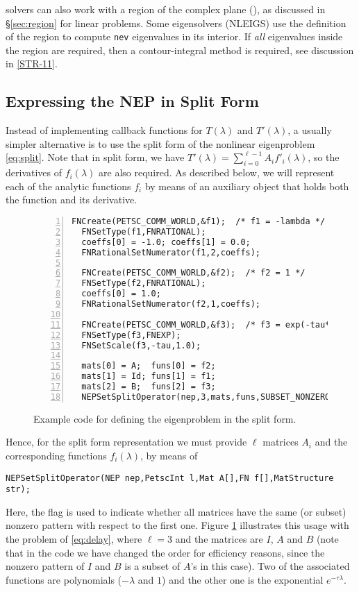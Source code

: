  solvers can also work with a region of the complex plane (), as discussed in \S\ref{sec:region} for linear problems. Some eigensolvers (NLEIGS) use the definition of the region to compute \texttt{nev} eigenvalues in its interior. If \emph{all} eigenvalues inside the region are required, then a contour-integral method is required, see discussion in \hyperlink{str}{[STR-11]}.

\subsection{\label{sec:nepsplit}Expressing the NEP in Split Form}

Instead of implementing callback functions for $T(\lambda)$ and $T'(\lambda)$, a usually simpler alternative is to use the split form of the nonlinear eigenproblem \eqref{eq:split}. Note that in split form, we have $T'(\lambda)=\sum_{i=0}^{\ell-1}A_if'_i(\lambda)$, so the derivatives of $f_i(\lambda)$ are also required. As described below, we will represent each of the analytic functions $f_i$ by means of an auxiliary object  that holds both the function and its derivative.

\begin{figure}
\begin{Verbatim}[fontsize=\small,numbers=left,numbersep=6pt,xleftmargin=15mm]
  FNCreate(PETSC_COMM_WORLD,&f1);  /* f1 = -lambda */
  FNSetType(f1,FNRATIONAL);
  coeffs[0] = -1.0; coeffs[1] = 0.0;
  FNRationalSetNumerator(f1,2,coeffs);

  FNCreate(PETSC_COMM_WORLD,&f2);  /* f2 = 1 */
  FNSetType(f2,FNRATIONAL);
  coeffs[0] = 1.0;
  FNRationalSetNumerator(f2,1,coeffs);

  FNCreate(PETSC_COMM_WORLD,&f3);  /* f3 = exp(-tau*lambda) */
  FNSetType(f3,FNEXP);
  FNSetScale(f3,-tau,1.0);

  mats[0] = A;  funs[0] = f2;
  mats[1] = Id; funs[1] = f1;
  mats[2] = B;  funs[2] = f3;
  NEPSetSplitOperator(nep,3,mats,funs,SUBSET_NONZERO_PATTERN);
\end{Verbatim}
\caption{\label{fig:ex-split}Example code for defining the  eigenproblem in the split form.}
\end{figure}

Hence, for the split form representation we must provide $\ell$ matrices $A_i$ and the corresponding functions $f_i(\lambda)$, by means of%
	\begin{Verbatim}[fontsize=\small]
	NEPSetSplitOperator(NEP nep,PetscInt l,Mat A[],FN f[],MatStructure str);
	\end{Verbatim}
Here, the  flag is used to indicate whether all matrices have the same (or subset) nonzero pattern with respect to the first one.
Figure \ref{fig:ex-split} illustrates this usage with the problem of \eqref{eq:delay}, where $\ell=3$ and the matrices are $I$, $A$ and $B$ (note that in the code we have changed the order for efficiency reasons, since the nonzero pattern of $I$ and $B$ is a subset of $A$'s in this case). Two of the associated functions are polynomials ($-\lambda$ and $1$) and the other one is the exponential $e^{-\tau\lambda}$.

